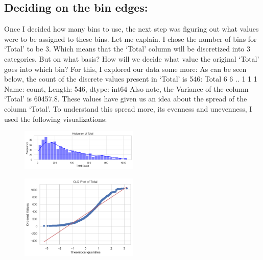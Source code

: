 \subsection{Deciding on the bin edges:}
Once I decided how many bins to use, the next step was figuring out what values were to be assigned to these bins. Let me explain. I chose the number of bins for ‘Total’ to be 3. Which means that the ‘Total’ column will be discretized into 3 categories. But on what basis? How will we decide what value the original ‘Total’ goes into which bin? For this, I explored our data some more:
\newline
\newline
As can be seen below, the count of the discrete values present in ‘Total’ is 546:
\newline
Total
    6
    6
\newline
      ..
    1
    1
    1
\newline
Name: count, Length: 546, dtype: int64
\newline
Also note, the Variance of the column ‘Total’ is 60457.8.
\newline 
\newline 
These values have given us an idea about the spread of the column ‘Total’. To understand this spread more, its evenness and unevenness, I used the following visualizations:
\begin{figure}[h]
    \centering
    \includegraphics[width=0.5\textwidth]{Chapters/ch9/ch_9_hist.png}
\end{figure}
\begin{figure}[h]
    \centering
    \includegraphics[width=0.5\textwidth]{Chapters/ch9/ch_9_linechart.png}
\end{figure}
